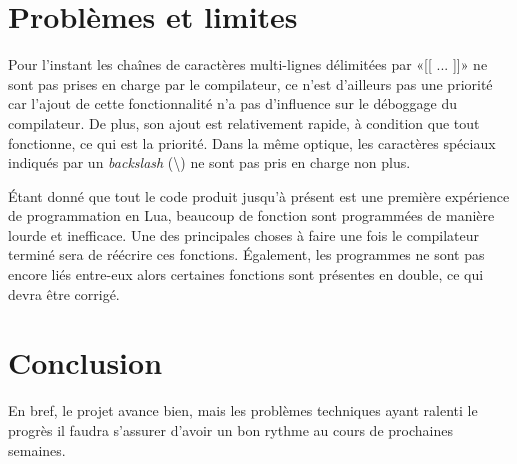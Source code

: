 \documentclass{article}
\begin{document}
\section{Problèmes et limites}
Pour l'instant les chaînes de caractères multi-lignes délimitées par «[[ ... ]]» ne sont pas prises en charge par le compilateur, ce n'est d'ailleurs pas une priorité car l'ajout de cette fonctionnalité n'a pas d'influence sur le déboggage du compilateur. De plus, son ajout est relativement rapide, à condition que tout fonctionne, ce qui est la priorité. Dans la même optique, les caractères spéciaux indiqués par un \textit{backslash} (\textbackslash) ne sont pas pris en charge non plus.

Étant donné que tout le code produit jusqu'à présent est une première expérience de programmation en Lua, beaucoup de fonction sont programmées de manière lourde et inefficace. Une des principales choses à faire une fois le compilateur terminé sera de réécrire ces fonctions. Également, les programmes ne sont pas encore liés entre-eux alors certaines fonctions sont présentes en double, ce qui devra être corrigé.

\section{Conclusion}
En bref, le projet avance bien, mais les problèmes techniques ayant ralenti le progrès il faudra s'assurer d'avoir un bon rythme au cours de prochaines semaines.
\end{document}
